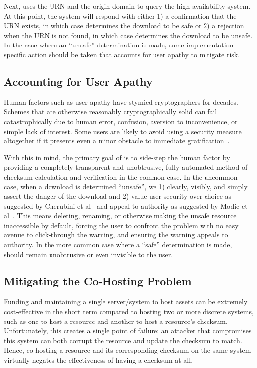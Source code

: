 Next, \SYSTEM{} uses the URN and the origin domain to query the high
availability system. At this point, the system will respond with either 1) a
confirmation that the URN exists, in which case \SYSTEM{} determines the
download to be safe or 2) a rejection when the URN is not found, in which case
\SYSTEM{} determines the download to be unsafe. In the case where an ``unsafe''
determination is made, some implementation-specific action should be taken that
accounts for user apathy to mitigate risk.

\subsection{Accounting for User Apathy}

Human factors such as user apathy have stymied cryptographers for decades.
Schemes that are otherwise reasonably cryptographically solid can fail
catastrophically due to human error, confusion, aversion to inconvenience, or
simple lack of interest. Some users are likely to avoid using a security measure
altogether if it presents even a minor obstacle to immediate
gratification~\cite{PGPBad, Egelman1, Egelman2, Modic, Reeder, Silic, Sunshine,
Bianchi, Akhawe, Cherubini}.

With this in mind, the primary goal of \SYSTEM{} is to side-step the human
factor by providing a completely transparent and unobtrusive, fully-automated
method of checksum calculation and verification in the common case. In the
uncommon case, when a download is determined ``unsafe'', we 1) clearly, visibly,
and simply assert the danger of the download and 2) value user security over
choice as suggested by Cherubini et al~\cite{Cherubini} and appeal to authority
as suggested by Modic et al~\cite{Modic}. This means deleting, renaming, or
otherwise making the unsafe resource inaccessible by default, forcing the user
to confront the problem with no easy avenue to click-through the warning, and
ensuring the warning appeals to authority. In the more common case where a
``safe'' determination is made, \SYSTEM{} should remain unobtrusive or even
invisible to the user.

\subsection{Mitigating the Co-Hosting Problem}

Funding and maintaining a single server/system to host assets can be extremely
cost-effective in the short term compared to hosting two or more discrete
systems, such as one to host a resource and another to host a resource's
checksum. Unfortunately, this creates a single point of failure: an attacker
that compromises this system can both corrupt the resource and update the
checksum to match. Hence, co-hosting a resource and its corresponding checksum
on the same system virtually negates the effectiveness of having a checksum at
all.

